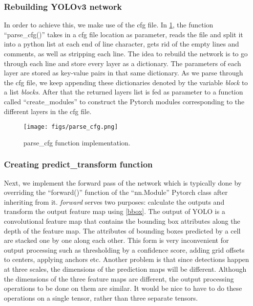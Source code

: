 \subsubsection{Rebuilding YOLOv3 network}
In order to achieve this, we make use of the cfg file. In \cref{fig:parse_cfg}, the function ``parse\_cfg()'' takes in a cfg file location as parameter, reads the file and split it into a python list at each end of line character, gets rid of the empty lines and comments, as well as stripping each line. The idea to rebuild the network is to go through each line and store every layer as a dictionary. The parameters of each layer are stored as key-value pairs in that same dictionary. As we parse through the cfg file, we keep appending these dictionaries denoted by the variable \emph{block} to a list \emph{blocks}.
After that the returned layers list is fed as parameter to a function called ``create\_modules'' to construct the Pytorch modules corresponding to the different layers in the cfg file.

\begin{figure}[!htpb]
	\centering
	\texttt{[image: figs/parse\_cfg.png]}
	\caption{parse\_cfg function implementation.}
	\label{fig:parse_cfg}
\end{figure}

\subsubsection{Creating predict\_transform function}

Next, we implement the forward pass of the network which is typically done by overriding the ``forward()'' function of
the ``nn.Module'' Pytorch class after inheriting from it. \emph{forward} serves two purposes: calculate the outputs
and transform the output feature map using \cref{bbox}.
The output of YOLO is a convolutional feature map that contains the bounding box attributes along the depth of the feature map.
The attributes of bounding boxes predicted by a cell are stacked one by one along each other. This form is very inconvenient for
output processing such as thresholding by a confidence score, adding grid offsets to centers, applying anchors etc.
Another problem is that since detections happen at three scales, the dimensions of the prediction maps will be different.
Although the dimensions of the three feature maps are different, the output processing operations to be done on them are
similar. It would be nice to have to do these operations on a single tensor, rather than three separate tensors.

